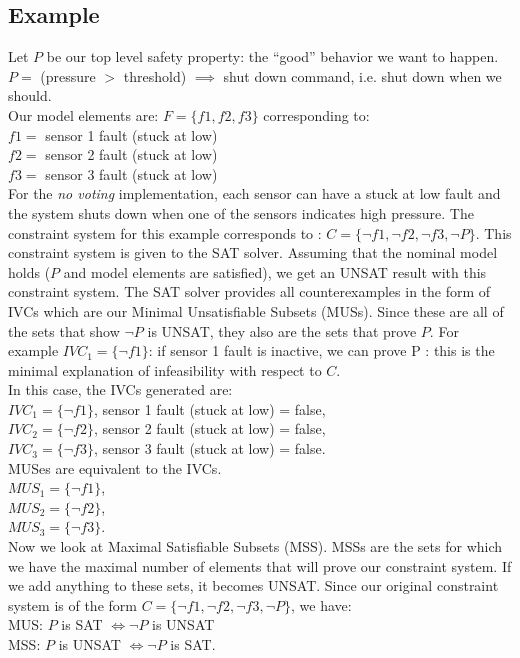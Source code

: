 \subsection{Example}
Let $P$ be our top level safety property: the ``good'' behavior we want to happen.\\ 

$P =  $ (pressure $>$ threshold) $\implies$ shut down command, i.e. shut down when we should. \\

Our model elements are: $F = \{f1, f2, f3\}$ corresponding to: \\
$f1 =$ sensor 1 fault (stuck at low)\\
$f2 =$ sensor 2 fault (stuck at low)\\
$f3 =$ sensor 3 fault (stuck at low)\\

For the \textit{no voting} implementation, each sensor can have a stuck at low fault and the system shuts down when one of the sensors indicates high pressure. The constraint system for this example corresponds to : $C = \{\neg f1, \neg f2, \neg f3, \neg P\}$. This constraint system is given to the SAT solver. Assuming that the nominal model holds ($P$ and model elements are satisfied), we get an UNSAT result with this constraint system. The SAT solver provides all counterexamples in the form of IVCs which are our Minimal Unsatisfiable Subsets (MUSs). Since these are all of the sets that show $\neg P$ is UNSAT, they also are the sets that prove $P$. For example $IVC_1 = \{\neg f1\}$: if sensor 1 fault is inactive, we can prove P : this is the minimal explanation of infeasibility with respect to $C$.\\

In this case, the IVCs generated are: \\
$IVC_1 = \{\neg f1\}$, sensor 1 fault (stuck at low) = false,\\
$IVC_2 = \{\neg f2\}$, sensor 2 fault (stuck at low) = false,\\
$IVC_3 = \{\neg f3\}$, sensor 3 fault (stuck at low) = false.\\

MUSes are equivalent to the IVCs. \\
$MUS_1 = \{\neg f1\}$,\\
$MUS_2 = \{\neg f2\}$,\\
$MUS_3 = \{\neg f3\}$.\\

Now we look at Maximal Satisfiable Subsets (MSS). MSSs are the sets for which we have the maximal number of elements that will prove our constraint system. If we add anything to these sets, it becomes UNSAT. Since our original constraint system is of the form $C = \{\neg f1, \neg f2, \neg f3, \neg P\}$, we have:\\
MUS: $P$ is SAT $\iff \neg P$ is UNSAT\\
MSS: $P$ is UNSAT $\iff \neg P$ is SAT. \\

